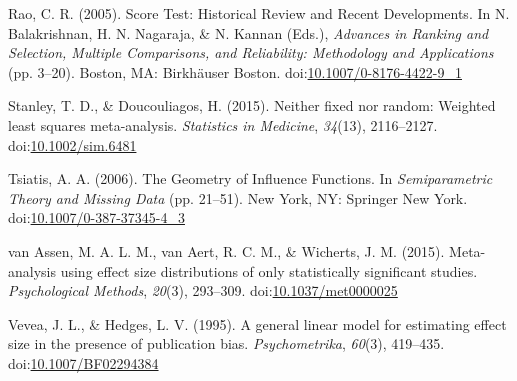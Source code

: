 \documentclass[man,floatsintext]{apa6}
\begin{document}
\leavevmode\hypertarget{ref-rao2005ScoreTestHistorical}{}%
Rao, C. R. (2005). Score Test: Historical Review and Recent Developments. In N. Balakrishnan, H. N. Nagaraja, \& N. Kannan (Eds.), \emph{Advances in Ranking and Selection, Multiple Comparisons, and Reliability: Methodology and Applications} (pp. 3--20). Boston, MA: Birkhäuser Boston. doi:\href{https://doi.org/10.1007/0-8176-4422-9_1}{10.1007/0-8176-4422-9\_1}

\leavevmode\hypertarget{ref-stanley2015NeitherFixedRandom}{}%
Stanley, T. D., \& Doucouliagos, H. (2015). Neither fixed nor random: Weighted least squares meta-analysis. \emph{Statistics in Medicine}, \emph{34}(13), 2116--2127. doi:\href{https://doi.org/10.1002/sim.6481}{10.1002/sim.6481}

\leavevmode\hypertarget{ref-tsiatis2006GeometryInfluenceFunctions}{}%
Tsiatis, A. A. (2006). The Geometry of Influence Functions. In \emph{Semiparametric Theory and Missing Data} (pp. 21--51). New York, NY: Springer New York. doi:\href{https://doi.org/10.1007/0-387-37345-4_3}{10.1007/0-387-37345-4\_3}

\leavevmode\hypertarget{ref-vanassen2015MetaanalysisUsingEffect}{}%
van Assen, M. A. L. M., van Aert, R. C. M., \& Wicherts, J. M. (2015). Meta-analysis using effect size distributions of only statistically significant studies. \emph{Psychological Methods}, \emph{20}(3), 293--309. doi:\href{https://doi.org/10.1037/met0000025}{10.1037/met0000025}

\leavevmode\hypertarget{ref-vevea1995GeneralLinearModel}{}%
Vevea, J. L., \& Hedges, L. V. (1995). A general linear model for estimating effect size in the presence of publication bias. \emph{Psychometrika}, \emph{60}(3), 419--435. doi:\href{https://doi.org/10.1007/BF02294384}{10.1007/BF02294384}

\endgroup
\end{document}
